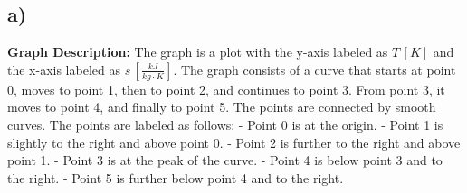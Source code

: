 

\subsection*{a)}

\textbf{Graph Description:} The graph is a plot with the y-axis labeled as \( T \, [K] \) and the x-axis labeled as \( s \, [\frac{kJ}{kg \cdot K}] \). The graph consists of a curve that starts at point 0, moves to point 1, then to point 2, and continues to point 3. From point 3, it moves to point 4, and finally to point 5. The points are connected by smooth curves. The points are labeled as follows:
- Point 0 is at the origin.
- Point 1 is slightly to the right and above point 0.
- Point 2 is further to the right and above point 1.
- Point 3 is at the peak of the curve.
- Point 4 is below point 3 and to the right.
- Point 5 is further below point 4 and to the right.